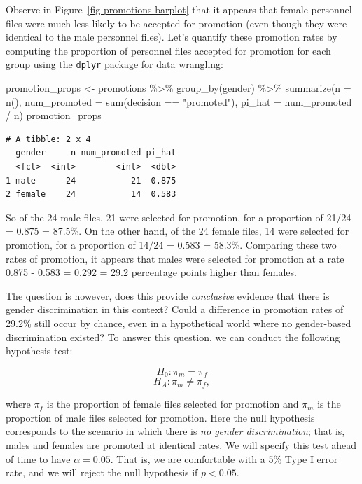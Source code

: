 \documentclass[
  letterpaper,
  DIV=11,
  numbers=noendperiod]{scrreprt}
\newenvironment{Shaded}{\begin{snugshade}}{\end{snugshade}}
\newcommand{\AttributeTok}[1]{\textcolor[rgb]{0.40,0.45,0.13}{#1}}
\newcommand{\FunctionTok}[1]{\textcolor[rgb]{0.28,0.35,0.67}{#1}}
\newcommand{\NormalTok}[1]{\textcolor[rgb]{0.00,0.23,0.31}{#1}}
\newcommand{\OtherTok}[1]{\textcolor[rgb]{0.00,0.23,0.31}{#1}}
\newcommand{\SpecialCharTok}[1]{\textcolor[rgb]{0.37,0.37,0.37}{#1}}
\newcommand{\StringTok}[1]{\textcolor[rgb]{0.13,0.47,0.30}{#1}}
\theoremstyle{definition}
\theoremstyle{remark}
\begin{document}
Observe in Figure~\ref{fig-promotions-barplot} that it appears that
female personnel files were much less likely to be accepted for
promotion (even though they were identical to the male personnel files).
Let's quantify these promotion rates by computing the proportion of
personnel files accepted for promotion for each group using the
\texttt{dplyr} package for data wrangling:

\begin{Shaded}
\begin{Highlighting}[]
\NormalTok{promotion\_props }\OtherTok{\textless{}{-}}\NormalTok{ promotions }\SpecialCharTok{\%\textgreater{}\%}
  \FunctionTok{group\_by}\NormalTok{(gender) }\SpecialCharTok{\%\textgreater{}\%}
  \FunctionTok{summarize}\NormalTok{(}\AttributeTok{n =} \FunctionTok{n}\NormalTok{(),}
            \AttributeTok{num\_promoted =} \FunctionTok{sum}\NormalTok{(decision }\SpecialCharTok{==} \StringTok{"promoted"}\NormalTok{),}
            \AttributeTok{pi\_hat =}\NormalTok{ num\_promoted }\SpecialCharTok{/}\NormalTok{ n)}
\NormalTok{promotion\_props}
\end{Highlighting}
\end{Shaded}

\begin{verbatim}
# A tibble: 2 x 4
  gender     n num_promoted pi_hat
  <fct>  <int>        <int>  <dbl>
1 male      24           21  0.875
2 female    24           14  0.583
\end{verbatim}

So of the 24 male files, 21 were selected for promotion, for a
proportion of 21/24 = 0.875 = 87.5\%. On the other hand, of the 24
female files, 14 were selected for promotion, for a proportion of 14/24
= 0.583 = 58.3\%. Comparing these two rates of promotion, it appears
that males were selected for promotion at a rate 0.875 - 0.583 = 0.292 =
29.2 percentage points higher than females.

The question is however, does this provide \emph{conclusive} evidence
that there is gender discrimination in this context? Could a difference
in promotion rates of 29.2\% still occur by chance, even in a
hypothetical world where no gender-based discrimination existed? To
answer this question, we can conduct the following hypothesis test:

\[H_0: \pi_m = \pi_f\] \[H_A: \pi_m \neq \pi_f,\]

where \(\pi_f\) is the proportion of female files selected for promotion
and \(\pi_m\) is the proportion of male files selected for promotion.
Here the null hypothesis corresponds to the scenario in which there is
\emph{no gender discrimination}; that is, males and females are promoted
at identical rates. We will specify this test ahead of time to have
\(\alpha = 0.05\). That is, we are comfortable with a 5\% Type I error
rate, and we will reject the null hypothesis if \(p < 0.05\).
\end{document}

